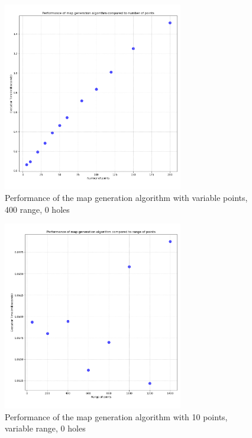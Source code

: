 \documentclass[final]{cmpreport_02}
\begin{document}


\begin{figure}[h!]
	\centering
	\includegraphics[width=0.7\textwidth]{./images/mapGenPointsRT.png}
	\caption{Performance of the map generation algorithm with variable points, 400 range, 0 holes}
	\label{PE:mg:points}
\end{figure}


\begin{figure}[h!]
	\centering
	\includegraphics[width=0.7\textwidth]{./images/mapGenRangeRT.png}
	\caption{Performance of the map generation algorithm with 10 points, variable range, 0 holes}
	\label{PE:mg:range}
\end{figure}
\end{document}
